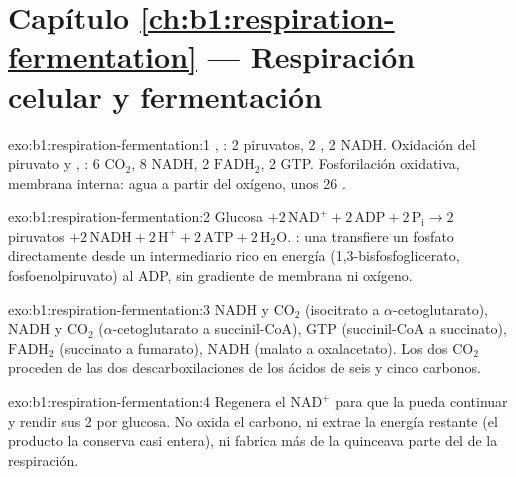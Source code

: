\section*{Capítulo \ref{ch:b1:respiration-fermentation} --- Respiración celular y fermentación}

\begin{solution}{exo:b1:respiration-fermentation:1}
, : 2 piruvatos, 2 , 2 NADH. Oxidación del piruvato y
, : 6 $\mathrm{CO_2}$, 8 NADH, 2
$\mathrm{FADH_2}$, 2 GTP. Fosforilación oxidativa, membrana interna: agua a
partir del oxígeno, unos 26 .
\end{solution}

\begin{solution}{exo:b1:respiration-fermentation:2}
Glucosa $+ 2\,\mathrm{NAD^+} + 2\,\mathrm{ADP} + 2\,\mathrm{P_i} \to
2$ piruvatos $+ 2\,\mathrm{NADH} + 2\,\mathrm{H^+} + 2\,\mathrm{ATP} +
2\,\mathrm{H_2O}$. : una  transfiere
un fosfato directamente desde un intermediario rico en energía
(1,3-bisfosfoglicerato, fosfoenolpiruvato) al ADP, sin gradiente de membrana
ni oxígeno.
\end{solution}

\begin{solution}{exo:b1:respiration-fermentation:3}
NADH y $\mathrm{CO_2}$ (isocitrato a $\alpha$-cetoglutarato), NADH y
$\mathrm{CO_2}$ ($\alpha$-cetoglutarato a succinil-CoA), GTP (succinil-CoA a
succinato), $\mathrm{FADH_2}$ (succinato a fumarato), NADH (malato a
oxalacetato). Los dos $\mathrm{CO_2}$ proceden de las dos descarboxilaciones
de los ácidos de seis y cinco carbonos.
\end{solution}

\begin{solution}{exo:b1:respiration-fermentation:4}
Regenera el $\mathrm{NAD^+}$ para que la  pueda continuar y rendir
sus 2  por glucosa. No oxida el carbono, ni extrae la energía restante
(el producto la conserva casi entera), ni fabrica más de la quinceava parte
del  de la respiración.
\end{solution}

